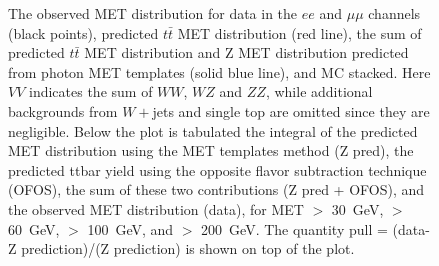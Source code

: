 \begin{figure}[hbtp]
\begin{center}
    \caption{
      The observed MET distribution for data in the $ee$ and $\mu\mu$ channels (black points),
      predicted $t\bar{t}$ MET distribution (red line), the sum of predicted $t\bar{t}$ MET distribution and
      Z  MET  distribution  predicted  from photon  MET  templates
      (solid blue line),  and MC stacked. Here $VV$  indicates the sum
      of  $WW$,  $WZ$  and  $ZZ$, while  additional  backgrounds  from
      $W+$jets   and   single  top   are   omitted   since  they   are
      negligible.  Below the  plot is  tabulated the  integral  of the
      predicted  MET distribution  using the  MET templates  method (Z
      pred),  the  predicted ttbar  yield  using  the opposite  flavor
      subtraction  technique (OFOS), the  sum of  these two
      contributions (Z pred + OFOS), and the observed MET distribution
      (data), for  
	  MET $>$ 30~GeV,  $>$ 60~GeV,  $>$ 100~GeV, and $>$  200~GeV. 
	  The quantity pull  = (data-Z prediction)/(Z prediction)  is shown on
      top of the  plot.  
    }
    \label{fig:pfmet_eemm}
  \end{center}
\end{figure}

